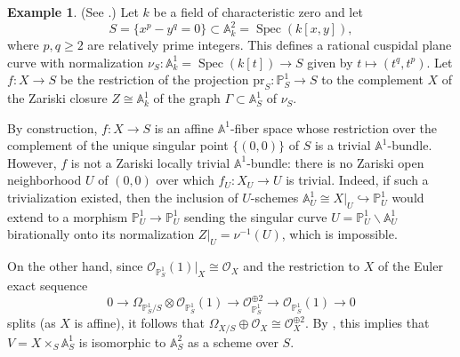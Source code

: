 \documentclass[10pt]{amsart}
\renewcommand{\AA}{\mathbb{A}}
\newcommand{\Spec}{\operatorname{Spec}}
\renewcommand{\setminus}{\smallsetminus}
\numberwithin{equation}{section} %
\theoremstyle{plain}
\theoremstyle{definition}
\newtheorem{example}[example]{Example}
\theoremstyle{remark}
\newcommand{\PP}{\mathbb{P}}
\begin{document}
\begin{example}\label{ex:KambWright}
(See \cite[\S 3.4]{KW85}.) Let $k$ be a field of characteristic zero and let
\[
S=\{x^p-y^q=0\}\subset \AA^2_k=\Spec(k[x,y]),
\]
where $p,q\geq 2$ are relatively prime integers. This defines a rational cuspidal plane curve with normalization $\nu_S:\AA^1_k=\Spec(k[t])\to S$ given by $t\mapsto (t^q,t^p)$. Let $f:X\to S$ be the restriction of the projection $\mathrm{pr}_S:\PP^1_S\to S$ to the complement $X$ of the Zariski closure $Z\cong \AA^1_k$ of the graph $\Gamma\subset \AA^1_S$ of $\nu_S$.
\medskip

By construction, $f:X\to S$ is an affine $\AA^1$-fiber space whose restriction over the complement of the unique singular point $\{(0,0)\}$ of $S$ is a trivial $\AA^1$-bundle. However, $f$ is not a Zariski locally trivial $\AA^1$-bundle: there is no Zariski open neighborhood $U$ of $(0,0)$ over which $f_U:X_U\to U$ is trivial. Indeed, if such a trivialization existed, then the inclusion of $U$-schemes $\AA^1_U\cong X|_U\hookrightarrow \PP^1_U$ would extend to a morphism $\PP^1_U\to \PP^1_U$ sending the singular curve $U=\PP^1_U\setminus \AA^1_U$ birationally onto its normalization $Z|_U=\nu^{-1}(U)$, which is impossible.
\medskip

On the other hand, since $\mathcal{O}_{\PP^1_S}(1)|_X\cong \mathcal{O}_X$ and the restriction to $X$ of the Euler exact sequence
\[
0\to \Omega_{\PP^1_S/S}\otimes \mathcal{O}_{\PP^1_S}(1)\to \mathcal{O}_{\PP^1_S}^{\oplus 2}\to \mathcal{O}_{\PP^1_S}(1)\to 0
\]
splits (as $X$ is affine), it follows that $\Omega_{X/S}\oplus \mathcal{O}_X\cong \mathcal{O}_X^{\oplus 2}$. By \cite[Corollary 4.7]{asanuma82}, this implies that $V=X\times_S\AA^1_S$ is isomorphic to $\AA^2_S$ as a scheme over $S$.
\end{example}
\end{document}

